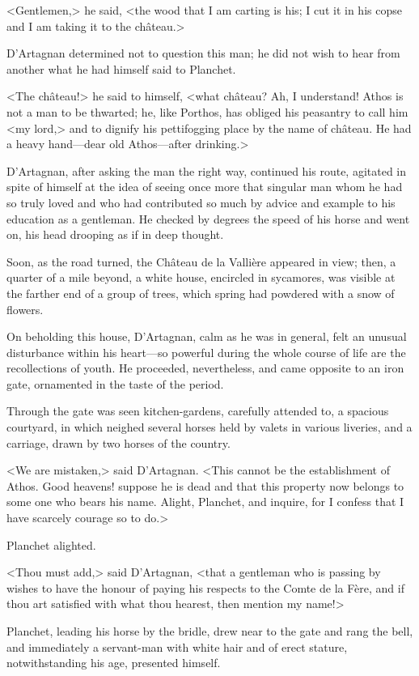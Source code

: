 <Gentlemen,> he said, <the wood that I am carting is his; I cut it in his copse and I am taking it to the château.>

D'Artagnan determined not to question this man; he did not wish to hear from another what he had himself said to Planchet.

<The château!> he said to himself, <what château? Ah, I understand! Athos is not a man to be thwarted; he, like Porthos, has obliged his peasantry to call him <my lord,> and to dignify his pettifogging place by the name of château. He had a heavy hand—dear old Athos—after drinking.>

D'Artagnan, after asking the man the right way, continued his route, agitated in spite of himself at the idea of seeing once more that singular man whom he had so truly loved and who had contributed so much by advice and example to his education as a gentleman. He checked by degrees the speed of his horse and went on, his head drooping as if in deep thought.

Soon, as the road turned, the Château de la Vallière appeared in view; then, a quarter of a mile beyond, a white house, encircled in sycamores, was visible at the farther end of a group of trees, which spring had powdered with a snow of flowers.

On beholding this house, D'Artagnan, calm as he was in general, felt an unusual disturbance within his heart—so powerful during the whole course of life are the recollections of youth. He proceeded, nevertheless, and came opposite to an iron gate, ornamented in the taste of the period.

Through the gate was seen kitchen-gardens, carefully attended to, a spacious courtyard, in which neighed several horses held by valets in various liveries, and a carriage, drawn by two horses of the country.

<We are mistaken,> said D'Artagnan. <This cannot be the establishment of Athos. Good heavens! suppose he is dead and that this property now belongs to some one who bears his name. Alight, Planchet, and inquire, for I confess that I have scarcely courage so to do.>

Planchet alighted.

<Thou must add,> said D'Artagnan, <that a gentleman who is passing by wishes to have the honour of paying his respects to the Comte de la Fère, and if thou art satisfied with what thou hearest, then mention my name!>

Planchet, leading his horse by the bridle, drew near to the gate and rang the bell, and immediately a servant-man with white hair and of erect stature, notwithstanding his age, presented himself.

